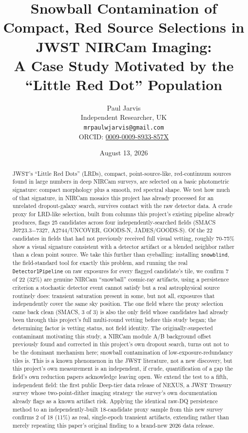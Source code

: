 \documentclass[11pt]{article}
\title{Snowball Contamination of Compact, Red Source Selections in JWST NIRCam Imaging:\\
A Case Study Motivated by the ``Little Red Dot'' Population}
\author{Paul Jarvis \\
Independent Researcher, UK \\
\texttt{mrpaulwjarvis@gmail.com} \\
ORCID: \href{https://orcid.org/0009-0009-8933-857X}{0009-0009-8933-857X}}
\date{August 13, 2026}
\begin{document}
\maketitle

\begin{abstract}
JWST's ``Little Red Dots'' (LRDs), compact, point-source-like, red-continuum
sources found in large numbers in deep NIRCam surveys, are selected on a basic
photometric signature: compact morphology plus a smooth, red spectral shape. We
test how much of that signature, in NIRCam mosaics this project has already
processed for an unrelated dropout-galaxy search, survives contact with the raw
detector data. A crude proxy for LRD-like selection, built from columns this
project's existing pipeline already produces, flags 25 candidates across four
independently-searched fields (SMACS J0723.3$-$7327, A2744/UNCOVER, GOODS-N,
JADES/GOODS-S). Of the 22 candidates in fields that had not previously received
full visual vetting, roughly 70-75\% show a visual signature consistent with a
detector artifact or a blended neighbor rather than a clean point source. We take
this further than eyeballing: installing \texttt{snowblind}, the field-standard
tool for exactly this problem, and running the real \texttt{Detector1Pipeline} on
raw exposures for every flagged candidate's tile, we confirm 7 of 22 (32\%) are
genuine NIRCam ``snowball'' cosmic-ray artifacts, using a persistence criterion a
stochastic detector event cannot satisfy but a real astrophysical source
routinely does: transient saturation present in some, but not all, exposures that
independently cover the same sky position. The one field where the proxy
selection came back clean (SMACS, 3 of 3) is also the only field whose candidates
had already been through this project's full multi-round vetting before this
study began; the determining factor is vetting status, not field identity. The
originally-suspected contaminant motivating this study, a NIRCam module A/B
background offset previously found and corrected in this project's own dropout
search, turns out not to be the dominant mechanism here; snowball contamination
of low-exposure-redundancy tiles is. This is a known phenomenon in the JWST
literature, not a new discovery, but this project's own measurement is an
independent, if crude, quantification of a gap the field's own reduction papers
acknowledge leaving open. We extend the test to a fifth, independent field: the
first public Deep-tier data release of NEXUS, a JWST Treasury survey whose
two-point-dither imaging strategy the survey's own documentation already flags
as a known artifact risk. Applying the identical raw-DQ persistence method to an
independently-built 18-candidate proxy sample from this new survey confirms 2 of
18 (11\%) as real, single-epoch transient artifacts, extending rather than merely
repeating this paper's original finding to a brand-new 2026 data release.
\end{abstract}
\end{document}
